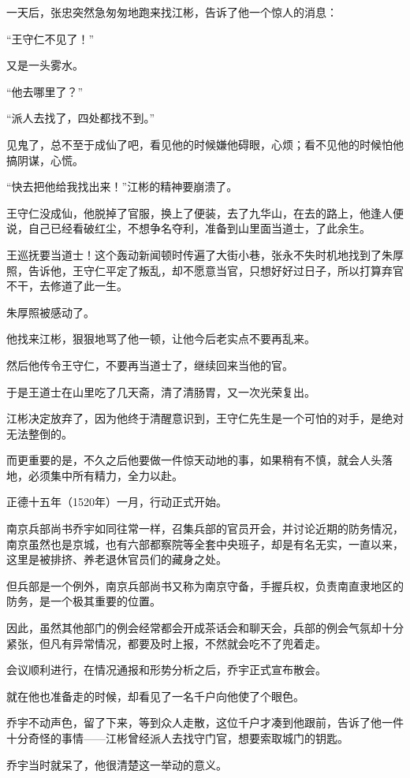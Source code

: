 \begin{multicols}{\theparacolNo}
一天后，张忠突然急匆匆地跑来找江彬，告诉了他一个惊人的消息：

“王守仁不见了！”

又是一头雾水。

“他去哪里了？”

“派人去找了，四处都找不到。”

见鬼了，总不至于成仙了吧，看见他的时候嫌他碍眼，心烦；看不见他的时候怕他搞阴谋，心慌。

“快去把他给我找出来！”江彬的精神要崩溃了。

王守仁没成仙，他脱掉了官服，换上了便装，去了九华山，在去的路上，他逢人便说，自己已经看破红尘，不想争名夺利，准备到山里面当道士，了此余生。

王巡抚要当道士！这个轰动新闻顿时传遍了大街小巷，张永不失时机地找到了朱厚照，告诉他，王守仁平定了叛乱，却不愿意当官，只想好好过日子，所以打算弃官不干，去修道了此一生。

朱厚照被感动了。

他找来江彬，狠狠地骂了他一顿，让他今后老实点不要再乱来。

然后他传令王守仁，不要再当道士了，继续回来当他的官。

于是王道士在山里吃了几天斋，清了清肠胃，又一次光荣复出。

江彬决定放弃了，因为他终于清醒意识到，王守仁先生是一个可怕的对手，是绝对无法整倒的。

而更重要的是，不久之后他要做一件惊天动地的事，如果稍有不慎，就会人头落地，必须集中所有精力，全力以赴。

正德十五年（1520年）一月，行动正式开始。

南京兵部尚书乔宇如同往常一样，召集兵部的官员开会，并讨论近期的防务情况，南京虽然也是京城，也有六部都察院等全套中央班子，却是有名无实，一直以来，这里是被排挤、养老退休官员们的藏身之处。

但兵部是一个例外，南京兵部尚书又称为南京守备，手握兵权，负责南直隶地区的防务，是一个极其重要的位置。

因此，虽然其他部门的例会经常都会开成茶话会和聊天会，兵部的例会气氛却十分紧张，但凡有异常情况，都要及时上报，不然就会吃不了兜着走。

会议顺利进行，在情况通报和形势分析之后，乔宇正式宣布散会。

就在他也准备走的时候，却看见了一名千户向他使了个眼色。

乔宇不动声色，留了下来，等到众人走散，这位千户才凑到他跟前，告诉了他一件十分奇怪的事情——江彬曾经派人去找守门官，想要索取城门的钥匙。

乔宇当时就呆了，他很清楚这一举动的意义。


\end{multicols}
